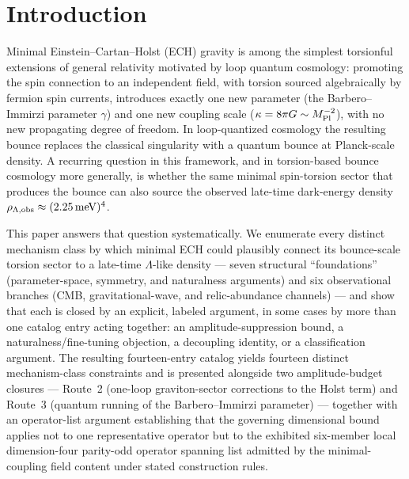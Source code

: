 \documentclass[aps,prd,twocolumn,superscriptaddress,showpacs,preprintnumbers,nofootinbib,longbibliography,floatfix]{revtex4-2}
\newcommand{\MPl}{M_{\rm Pl}}
\begin{document}
\maketitle

\section{Introduction}\label{sec:intro}

Minimal Einstein--Cartan--Holst (ECH) gravity is among the simplest
torsionful extensions of general relativity motivated by loop quantum
cosmology: promoting the spin connection to an independent field, with
torsion sourced algebraically by fermion spin currents, introduces exactly
one new parameter (the Barbero--Immirzi parameter $\gamma$) and one new
coupling scale ($\kappa=8\pi G\sim\MPl^{-2}$), with no new propagating degree
of freedom. In loop-quantized cosmology the resulting bounce replaces the
classical singularity with a quantum bounce at Planck-scale density. A
recurring question in this framework, and in torsion-based bounce
cosmology more generally, is whether the same minimal spin-torsion sector
that produces the bounce can also source the observed late-time
dark-energy density $\rho_{\Lambda,\rm obs}\approx(2.25\,\text{meV})^4$.

This paper answers that question systematically. We enumerate every
distinct mechanism class by which minimal ECH could plausibly connect its
bounce-scale torsion sector to a late-time $\Lambda$-like density ---
seven structural ``foundations'' (parameter-space, symmetry, and
naturalness arguments) and six observational branches (CMB,
gravitational-wave, and relic-abundance channels) --- and show that each
is closed by an explicit, labeled argument, in some cases by more than
one catalog entry acting together: an
amplitude-suppression bound, a naturalness/fine-tuning objection, a
decoupling identity, or a classification argument. The resulting
fourteen-entry catalog yields fourteen distinct mechanism-class
constraints and is
presented alongside two amplitude-budget closures --- Route~2 (one-loop
graviton-sector corrections to the Holst term) and Route~3 (quantum
running of the Barbero--Immirzi parameter) --- together with an
operator-list argument establishing that the governing
dimensional bound applies not to one representative operator but to the
exhibited six-member local dimension-four parity-odd operator spanning
list admitted by the minimal-coupling field content under stated
construction rules.
\end{document}
